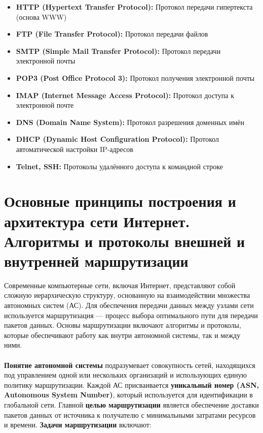 \documentclass[a4paper, 12pt]{report}
\numberwithin{equation}{section}
\begin{document}
\begin{itemize}
	\item \textbf{HTTP (Hypertext Transfer Protocol):} Протокол передачи гипертекста (основа WWW)
	\item \textbf{FTP (File Transfer Protocol):} Протокол передачи файлов
	\item \textbf{SMTP (Simple Mail Transfer Protocol):} Протокол передачи электронной почты
	\item \textbf{POP3 (Post Office Protocol 3):} Протокол получения электронной почты
	\item \textbf{IMAP (Internet Message Access Protocol):} Протокол доступа к электронной почте
	\item \textbf{DNS (Domain Name System):} Протокол разрешения доменных имён
	\item \textbf{DHCP (Dynamic Host Configuration Protocol):} Протокол автоматической настройки IP-адресов
	\item \textbf{Telnet, SSH:} Протоколы удалённого доступа к командной строке
\end{itemize}


\section{Основные принципы построения и архитектура сети Интернет. Алгоритмы и протоколы внешней и внутренней маршрутизации}

Современные компьютерные сети, включая Интернет, представляют собой сложную иерархическую структуру, основанную на взаимодействии множества автономных систем (АС). Для обеспечения передачи данных между узлами сети используется маршрутизация — процесс выбора оптимального пути для передачи пакетов данных. Основы маршрутизации включают алгоритмы и протоколы, которые обеспечивают работу как внутри автономной системы, так и между ними.
\\\\
\textbf{Понятие автономной системы} подразумевает совокупность сетей, находящихся под управлением одной или нескольких организаций и использующих единую политику маршрутизации. Каждой АС присваивается \textbf{уникальный номер (ASN, {Autonomous System Number})}, который используется для идентификации в глобальной сети. Главной \textbf{целью маршрутизации} является обеспечение доставки пакетов данных от источника к получателю с минимальными затратами ресурсов и времени. \textbf{Задачи маршрутизации} включают:
\end{document}
